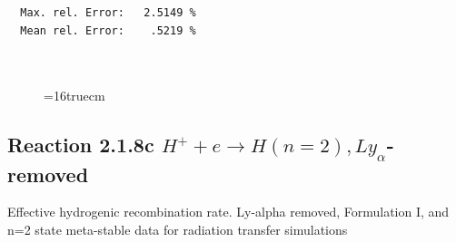 \documentclass[12pt,dvipdfmx]{article}
\begin{document}
\begin{small}
\begin{verbatim}
  Max. rel. Error:   2.5149 %
  Mean rel. Error:    .5219 %



\end{verbatim}\end{small}
\begin{figure} \label{2.1.8b}
\epsfxsize=16truecm
\end{figure}
\newpage
\subsection{
Reaction 2.1.8c  $H^+ + e \rightarrow H(n=2), Ly_\alpha$-removed
}


   Effective hydrogenic recombination rate.
   Ly-alpha removed, Formulation I, and n=2 state meta-stable
   data for radiation transfer simulations
\end{document}
